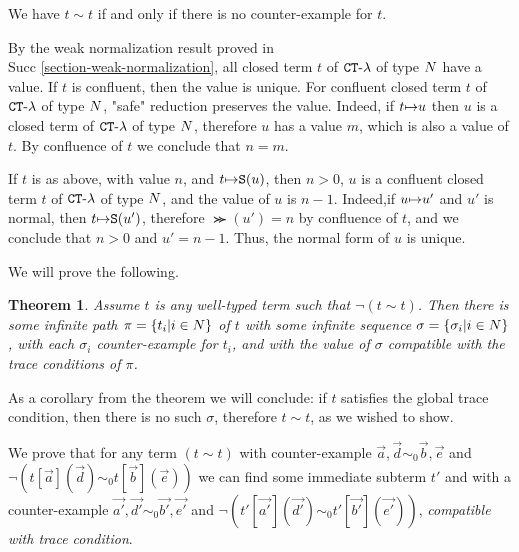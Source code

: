 \documentclass{article}
\newtheorem{theorem}{Theorem}[section]
\begin{document}
We have $t \sim t$ if and only if there is no counter-example for $t$.


By the weak normalization result proved in \\Succ  \ref{section-weak-normalization}, all 
closed term $t$ of ${ {\tt CT} \mbox{-} \lambda}$ of type ${N}$ have a value. If $t$ is confluent, then the value is unique.
For confluent closed term $t$ of ${ {\tt CT} \mbox{-} \lambda}$ of type ${N}$, "safe" reduction preserves the value. Indeed,
if $t {\mapsto} u$ then $u$ is a closed term of ${ {\tt CT} \mbox{-} \lambda}$ of type ${N}$, therefore $u$ has a value
$m$, which is also a value of $t$. By confluence of $t$ we conclude that $n=m$.

If $t$ is as above, with value $n$, and $t {\mapsto} {\tt S} (u)$, then $n>0$, 
$u$ is a confluent closed term $t$ of ${ {\tt CT} \mbox{-} \lambda}$ of type ${N}$, and the value of $u$ is $n-1$.
Indeed,if $u {\mapsto} u'$ and $u'$ is normal, then $t {\mapsto} {\tt S} (u')$, therefore $\Succ (u')=n$ 
by confluence of $t$, and we conclude that $n>0$ and $u'=n-1$. Thus, the normal form of $u$ is unique.

We will prove the following.

\begin{theorem}
Assume $t$ is any well-typed term such that $\neg (t \sim t)$. Then there is some infinite path 
$\pi=\{t_i | i \in {N}\}$ of $t$ with some infinite sequence $\sigma= \{\sigma_i| i \in {N}\}$, with
each $\sigma_i$ counter-example for $t_i$, and with the value of $\sigma$ compatible with the
trace conditions of $\pi$.
\end{theorem}

As a corollary from the theorem we will conclude: 
if $t$ satisfies the global trace condition, then there is no such $\sigma$, therefore $t \sim t$, 
as we wished to show.

We prove that for any term $ (t \sim t)$ with counter-example $\vec{a},\vec{d} \sim_0 \vec{b},\vec{e}$
and $\neg (t[\vec{a}](\vec{d}) \sim_0  t[\vec{b}](\vec{e}))$ we can find some immediate
subterm $t'$ and with a counter-example $\vec{a'},\vec{d'} \sim_0 \vec{b'},\vec{e'}$
and $\neg (t'[\vec{a'}](\vec{d'}) \sim_0  t'[\vec{b'}](\vec{e'}))$, \emph{compatible with trace
condition}.



%
%
\end{document}
